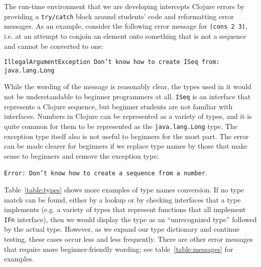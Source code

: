 \documentclass[submission,copyright,creativecommons]{eptcs}
\newcommand{\allcomments}[1]{{#1}}
\newcommand{\elenacomment}[1]{{\bf \textcolor{ForestGreen}{\allcomments{{#1}}}}}
\begin{document}
The run-time environment that we are developing intercepts Clojure errors by providing a {\tt try/catch} block around students' code and reformatting error messages. 
As an example, consider the following error message for {\tt (cons 2 3)}, i.e. at an attempt to conjoin an element onto something that is not a sequence and cannot be converted to one:

{\tt IllegalArgumentException Don't know how to create ISeq from: java.lang.Long}

While the wording of the message is reasonably clear, the types used in it would not be understandable to beginner programmers at all. {\tt ISeq} is an interface that represents a Clojure sequence, but beginner students are not familiar with interfaces. Numbers in Clojure can be represented as a variety of types, and it is quite common for them to be represented as the {\tt  java.lang.Long} type. The exception type itself also is not useful to beginners for the most part. 
The error can be made clearer for beginners if we replace type names by those that make sense to beginners and remove the exception type:

{\tt Error: Don't know how to create a sequence from a number}. 

Table~\ref{table:types} shows more examples of type names conversion. If no type match can be found, either by a lookup or by checking interfaces that a type implements (e.g. a variety of types that represent functions that all implement {\tt IFn} interface), then we would display the type as an ``unrecognized type'' followed by the actual type. However, as we expand our type dictionary and continue testing, these cases occur less and less frequently. 
There are other error messages that require more beginner-friendly wording; see table~\ref{table:messages} for examples. 
\end{document}
